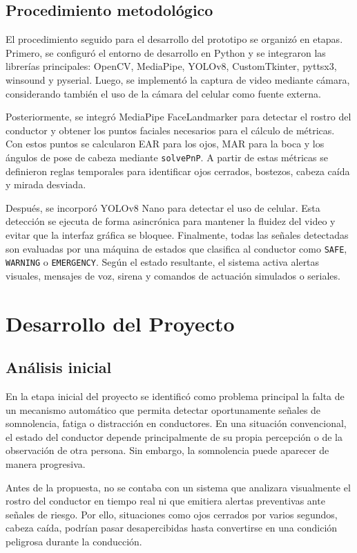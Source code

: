 \documentclass[conference]{IEEEtran}
\begin{document}
\subsection{Procedimiento metodológico}

El procedimiento seguido para el desarrollo del prototipo se organizó en etapas. Primero, se configuró el entorno de desarrollo en Python y se integraron las librerías principales: OpenCV, MediaPipe, YOLOv8, CustomTkinter, pyttsx3, winsound y pyserial. Luego, se implementó la captura de video mediante cámara, considerando también el uso de la cámara del celular como fuente externa.

Posteriormente, se integró MediaPipe FaceLandmarker para detectar el rostro del conductor y obtener los puntos faciales necesarios para el cálculo de métricas. Con estos puntos se calcularon EAR para los ojos, MAR para la boca y los ángulos de pose de cabeza mediante \texttt{solvePnP}. A partir de estas métricas se definieron reglas temporales para identificar ojos cerrados, bostezos, cabeza caída y mirada desviada.

Después, se incorporó YOLOv8 Nano para detectar el uso de celular. Esta detección se ejecuta de forma asincrónica para mantener la fluidez del video y evitar que la interfaz gráfica se bloquee. Finalmente, todas las señales detectadas son evaluadas por una máquina de estados que clasifica al conductor como \texttt{SAFE}, \texttt{WARNING} o \texttt{EMERGENCY}. Según el estado resultante, el sistema activa alertas visuales, mensajes de voz, sirena y comandos de actuación simulados o seriales.


\section{Desarrollo del Proyecto}


\subsection{Análisis inicial}

En la etapa inicial del proyecto se identificó como problema principal la falta de un mecanismo automático que permita detectar oportunamente señales de somnolencia, fatiga o distracción en conductores. En una situación convencional, el estado del conductor depende principalmente de su propia percepción o de la observación de otra persona. Sin embargo, la somnolencia puede aparecer de manera progresiva.

Antes de la propuesta, no se contaba con un sistema que analizara visualmente el rostro del conductor en tiempo real ni que emitiera alertas preventivas ante señales de riesgo. Por ello, situaciones como ojos cerrados por varios segundos, cabeza caída, podrían pasar desapercibidas hasta convertirse en una condición peligrosa durante la conducción.
\end{document}
